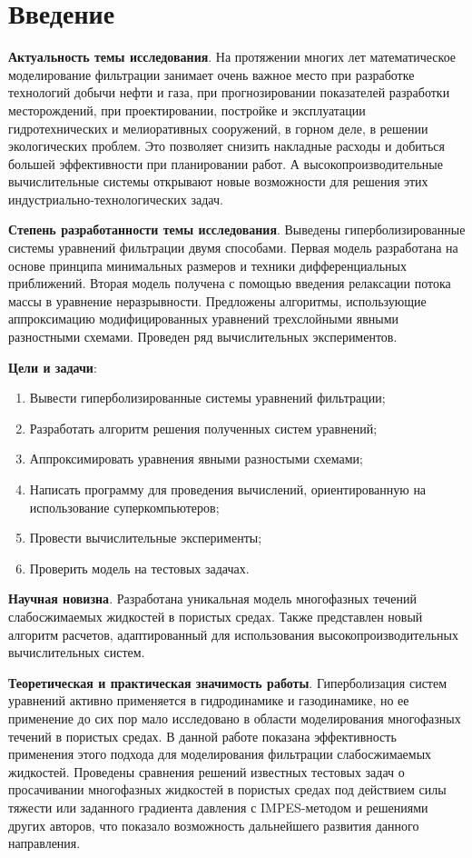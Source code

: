 \chapter*{Введение}                         %
\textbf{Актуальность темы исследования}. На протяжении многих лет математическое моделирование фильтрации занимает
очень важное место при разработке технологий добычи нефти и газа, при прогнозировании показателей разработки месторождений, 
при проектировании, постройке и эксплуатации гидротехнических и мелиоративных сооружений, в горном деле,
в решении экологических проблем. Это позволяет снизить накладные расходы и добиться большей эффективности при планировании работ.
А высокопроизводительные вычислительные системы открывают новые возможности для решения этих индустриально-технологических задач.

\textbf{Степень разработанности темы исследования}. Выведены гиперболизированные системы уравнений фильтрации двумя способами.
Первая модель разработана на основе принципа минимальных размеров и техники дифференциальных приближений.
Вторая модель получена с помощью введения релаксации потока массы в уравнение неразрывности.
Предложены алгоритмы, использующие аппроксимацию модифицированных уравнений трехслойными явными
разностными схемами. Проведен ряд вычислительных экспериментов.

\textbf{Цели и задачи}:
\begin{enumerate}
 \item Вывести гиперболизированные системы уравнений фильтрации;
 \item Разработать алгоритм решения полученных систем уравнений;
 \item Аппроксимировать уравнения явными разностыми схемами;
 \item Написать программу для проведения вычислений, ориентированную на использование суперкомпьютеров;
 \item Провести вычислительные эксперименты;
 \item Проверить модель на тестовых задачах.
\end{enumerate}

\textbf{Научная новизна}. Разработана уникальная модель многофазных течений слабосжимаемых жидкостей в пористых средах.
Также представлен новый алгоритм расчетов, адаптированный для использования высокопроизводительных вычислительных систем.

\textbf{Теоретическая и практическая значимость работы}. Гиперболизация систем уравнений активно применяется в гидродинамике и газодинамике, но ее применение  до сих пор мало исследовано в области моделирования многофазных течений в пористых средах. В данной работе показана эффективность применения этого подхода для моделирования фильтрации слабосжимаемых жидкостей. Проведены сравнения решений известных тестовых задач о просачивании многофазных жидкостей в пористых средах под действием силы тяжести или заданного градиента давления с IMPES-методом и решениями других авторов, что показало возможность дальнейшего развития данного направления.

